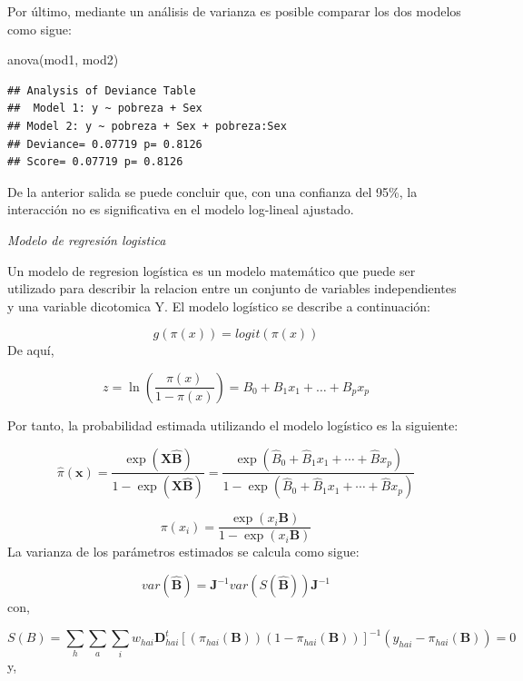 \documentclass[
  12pt,
]{book}
\newenvironment{Shaded}{\begin{snugshade}}{\end{snugshade}}
\newcommand{\FunctionTok}[1]{\textcolor[rgb]{0.00,0.00,0.00}{#1}}
\newcommand{\NormalTok}[1]{#1}
\begin{document}
Por último, mediante un análisis de varianza es posible comparar los dos modelos como sigue:

\begin{Shaded}
\begin{Highlighting}[]
\FunctionTok{anova}\NormalTok{(mod1, mod2)}
\end{Highlighting}
\end{Shaded}

\begin{verbatim}
## Analysis of Deviance Table
##  Model 1: y ~ pobreza + Sex
## Model 2: y ~ pobreza + Sex + pobreza:Sex 
## Deviance= 0.07719 p= 0.8126 
## Score= 0.07719 p= 0.8126
\end{verbatim}

De la anterior salida se puede concluir que, con una confianza del 95\%, la interacción no es significativa en el modelo log-lineal ajustado.

\emph{Modelo de regresión logistica}

Un modelo de regresion logística es un modelo matemático que puede ser utilizado para describir la relacion entre un conjunto de variables independientes y una variable dicotomica Y. El modelo logístico se describe a continuación:

\[
    g(\pi(x))=logit(\pi(x)) 
\]
De aquí,

\[
z = \ln\left(\frac{\pi(x)}{1-\pi(x)}\right) = B_0 + B_1x_1+\dots+B_px_p
\]

Por tanto, la probabilidad estimada utilizando el modelo logístico es la siguiente:

\[
    \hat{\pi}\left(\boldsymbol{x}\right)=\frac{\exp\left(\boldsymbol{X\hat{B}}\right)}{1-\exp\left(\boldsymbol{X\hat{B}}\right)}=\frac{\exp\left(\hat{B}_{0}+\hat{B}_{1}x_{1}+\cdots+\hat{B}x_{p}\right)}{1-\exp\left(\hat{B}_{0}+\hat{B}_{1}x_{1}+\cdots+\hat{B}x_{p}\right)}
\]

\[
    \pi\left(x_{i}\right)=\frac{\exp\left(x_{i}\boldsymbol{B}\right)}{1-\exp\left(x_{i}\boldsymbol{B}\right)}
\]
La varianza de los parámetros estimados se calcula como sigue:

\[
    var\left(\boldsymbol{\hat{B}}\right)=\boldsymbol{J}^{-1}var\left(S\left(\hat{\boldsymbol{B}}\right)\right)\boldsymbol{J}^{-1}
\]
con,

\[
    S\left(B\right)=\sum_{h}\sum_{a}\sum_{i}w_{hai}\boldsymbol{D}_{hai}^{t}\left[\left(\pi_{hai}\left(\boldsymbol{B}\right)\right)\left(1-\pi_{hai}\left(\boldsymbol{B}\right)\right)\right]^{-1}\left(y_{hai}-\pi_{hai}\left(\boldsymbol{B}\right)\right)=0
\]
y,
\end{document}
